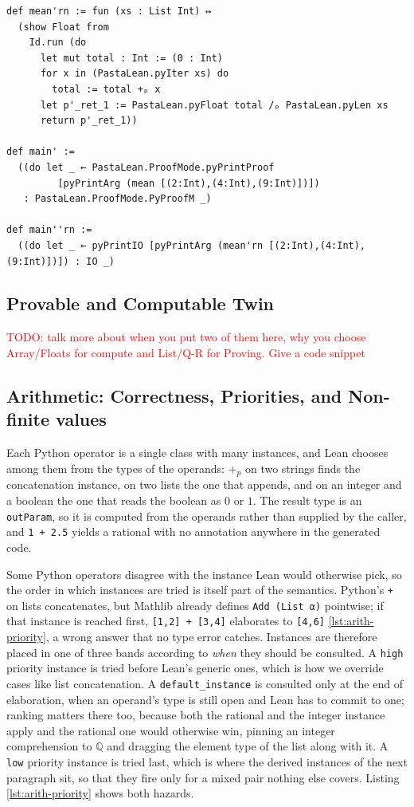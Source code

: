 \documentclass{article}
\newcommand{\code}{\lstinline}
\newcommand{\todo}[1]{\textcolor{red}{TODO: #1}}
\begin{document}
{\begin{lstlisting}[style=lean,caption={Verbatim generated Lean (provable + runnable twins).},label={lst:app-gen}]
def mean'rn := fun (xs : List Int) ↦
  (show Float from
    Id.run (do
      let mut total : Int := (0 : Int)
      for x in (PastaLean.pyIter xs) do
        total := total +ₚ x
      let p'_ret_1 := PastaLean.pyFloat total /ₚ PastaLean.pyLen xs
      return p'_ret_1))

def main' :=
  ((do let _ ← PastaLean.ProofMode.pyPrintProof
         [pyPrintArg (mean [(2:Int),(4:Int),(9:Int)])])
   : PastaLean.ProofMode.PyProofM _)

def main''rn :=
  ((do let _ ← pyPrintIO [pyPrintArg (mean'rn [(2:Int),(4:Int),(9:Int)])]) : IO _)
\end{lstlisting}


\subsection{Provable and Computable Twin}
\todo{talk more about when you put two of them here, why you choose Array/Floats for compute and List/Q-R for Proving. Give a code snippet}

\subsection{Arithmetic: Correctness, Priorities, and Non-finite values}\label{app:arith}

Each Python operator is a single class with many instances, and Lean chooses among them from the types of the operands: $+_p$ on two strings finds the concatenation instance, on two lists the one that appends, and on an integer and a boolean the one that reads the boolean as $0$ or $1$. The result type is an \code{outParam}, so it is computed from the operands rather than supplied by the caller, and \code{1 + 2.5} yields a rational with no annotation anywhere in the generated code.

Some Python operators disagree with the instance Lean would otherwise pick, so the order in which instances are tried is itself part of the semantics. Python's \code{+} on lists concatenates, but Mathlib already defines \code{Add (List α)} pointwise; if that instance is reached first, \code{[1,2] + [3,4]} elaborates to \code{[4,6]} \ref{lst:arith-priority}, a wrong answer that no type error catches. Instances are therefore placed in one of three bands according to \emph{when} they should be consulted. A \code{high} priority instance is tried before Lean's generic ones, which is how we override cases like list concatenation. A \code{default_instance} is consulted only at the end of elaboration, when an operand's type is still open and Lean has to commit to one; ranking matters there too, because both the rational and the integer instance apply and the rational one would otherwise win, pinning an integer comprehension to $\mathbb{Q}$ and dragging the element type of the list along with it. A \code{low} priority instance is tried last, which is where the derived instances of the next paragraph sit, so that they fire only for a mixed pair nothing else covers. Listing \ref{lst:arith-priority} shows both hazards.

}
\end{document}
